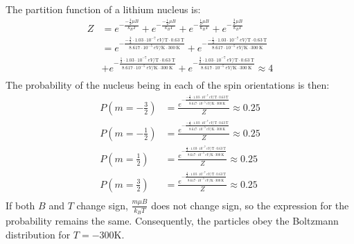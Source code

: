 \documentclass{article}
\begin{document}
\clearpage

The partition function of a lithium nucleus is:
\begin{equation}
    \begin{split}
        Z & = e^{-\frac{-\frac{3}{2}\mu B}{k_BT}} + e^{-\frac{-\frac{1}{2}\mu B}{k_BT}} + e^{-\frac{\frac{1}{2}\mu B}{k_BT}} + e^{-\frac{\frac{3}{2}\mu B}{k_BT}} \\
        & = e^{-\frac{-\frac{3}{2} \cdot 1.03 \cdot 10^{-7}~\unit{eV\per\tesla}\cdot 0.63~\unit{\tesla}}{8.617 \cdot 10^{-5}~\unit{eV\per\kelvin} \cdot 300~\unit{\kelvin}}} + e^{-\frac{-\frac{1}{2} \cdot 1.03 \cdot 10^{-7}~\unit{eV\per\tesla}\cdot 0.63~\unit{\tesla}}{8.617 \cdot 10^{-5}~\unit{eV\per\kelvin} \cdot 300~\unit{\kelvin}}} \\
        & + e^{-\frac{\frac{1}{2} \cdot 1.03 \cdot 10^{-7}~\unit{eV\per\tesla}\cdot 0.63~\unit{\tesla}}{8.617 \cdot 10^{-5}~\unit{eV\per\kelvin} \cdot 300~\unit{\kelvin}}} + e^{-\frac{\frac{3}{2} \cdot 1.03 \cdot 10^{-7}~\unit{eV\per\tesla}\cdot 0.63~\unit{\tesla}}{8.617 \cdot 10^{-5}~\unit{eV\per\kelvin} \cdot 300~\unit{\kelvin}}} \approx 4 \\
    \end{split}
\end{equation}
The probability of the nucleus being in each of the spin orientations is then:
\begin{equation}
    \begin{split}
        P\left(m = -\frac{3}{2}\right) & = \frac{e^{-\frac{-\frac{3}{2} \cdot 1.03 \cdot 10^{-7}~\unit{eV\per\tesla}\cdot 0.63~\unit{\tesla}}{8.617 \cdot 10^{-5}~\unit{eV\per\kelvin} \cdot 300~\unit{\kelvin}}}}{Z} \approx 0.25 \\
        P\left(m = -\frac{1}{2}\right) & = \frac{e^{-\frac{-\frac{1}{2} \cdot 1.03 \cdot 10^{-7}~\unit{eV\per\tesla}\cdot 0.63~\unit{\tesla}}{8.617 \cdot 10^{-5}~\unit{eV\per\kelvin} \cdot 300~\unit{\kelvin}}}}{Z} \approx 0.25 \\
        P\left(m = \frac{1}{2}\right) & = \frac{e^{-\frac{\frac{a}{2} \cdot 1.03 \cdot 10^{-7}~\unit{eV\per\tesla}\cdot 0.63~\unit{\tesla}}{8.617 \cdot 10^{-5}~\unit{eV\per\kelvin} \cdot 300~\unit{\kelvin}}}}{Z} \approx 0.25 \\
        P\left(m = \frac{3}{2}\right) & = \frac{e^{-\frac{\frac{3}{2} \cdot 1.03 \cdot 10^{-7}~\unit{eV\per\tesla}\cdot 0.63~\unit{\tesla}}{8.617 \cdot 10^{-5}~\unit{eV\per\kelvin} \cdot 300~\unit{\kelvin}}}}{Z} \approx 0.25 \\
    \end{split}
\end{equation}
If both $B$ and $T$ change sign, $\frac{m\mu B}{k_BT}$ does not change sign, so the expression for the probability remains the same. Consequently, the particles obey the Boltzmann distribution for $T = -300 \unit{\kelvin}$.
\end{document}
